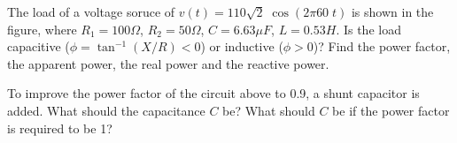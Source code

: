 \item The load of a voltage soruce of $v(t)=110\sqrt{2} \;\cos(2\pi 60\;t)$
is shown in the figure, where $R_1=100\Omega$, $R_2=50\Omega$, $C=6.63\mu F$, 
$L=0.53 H$. Is the load capacitive ($\phi=\tan^{-1}(X/R)<0$) or inductive 
($\phi>0$)? Find the power factor, the apparent power, the real power and 
the reactive power. 


%  

\item To improve the power factor of the circuit above to 0.9, a shunt 
capacitor is added. What should the capacitance $C$ be? What should $C$ be 
if the power factor is required to be 1?


 

